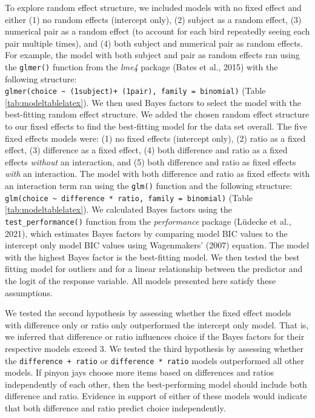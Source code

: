 \documentclass[
  ,pub,floatsintext]{apa6}
\begin{document}
To explore random effect structure, we included models with no fixed effect and either (1) no random effects (intercept only), (2) subject as a random effect, (3) numerical pair as a random effect (to account for each bird repeatedly seeing each pair multiple times), and (4) both subject and numerical pair as random effects. For example, the model with both subject and pair as random effects ran using the \texttt{glmer()} function from the \emph{lme4} package (Bates et al., 2015) with the following structure: \texttt{glmer(choice\ \textasciitilde{}\ (1\textbar{}subject)+\ (1\textbar{}pair),\ family\ =\ binomial)} (Table \ref{tab:modeltablelatex}). We then used Bayes factors to select the model with the best-fitting random effect structure. We added the chosen random effect structure to our fixed effects to find the best-fitting model for the data set overall. The five fixed effects models were: (1) no fixed effects (intercept only), (2) ratio as a fixed effect, (3) difference as a fixed effect, (4) both difference and ratio as a fixed effects \emph{without} an interaction, and (5) both difference and ratio as fixed effects \emph{with} an interaction. The model with both difference and ratio as fixed effects with an interaction term ran using the \texttt{glm()} function and the following structure: \texttt{glm(choice\ \textasciitilde{}\ difference\ *\ ratio,\ family\ =\ binomial)} (Table \ref{tab:modeltablelatex}). We calculated Bayes factors using the \texttt{test\_performance()} function from the \emph{performance} package (Lüdecke et al., 2021), which estimates Bayes factors by comparing model BIC values to the intercept only model BIC values using Wagenmakers' (2007) equation. The model with the highest Bayes factor is the best-fitting model. We then tested the best fitting model for outliers and for a linear relationship between the predictor and the logit of the response variable. All models presented here satisfy these assumptions.

We tested the second hypothesis by assessing whether the fixed effect models with difference only or ratio only outperformed the intercept only model. That is, we inferred that difference or ratio influences choice if the Bayes factors for their respective models exceed 3. We tested the third hypothesis by assessing whether the \texttt{difference\ +\ ratio} or \texttt{difference\ *\ ratio} models outperformed all other models. If pinyon jays choose more items based on differences and ratios independently of each other, then the best-performing model should include both difference and ratio. Evidence in support of either of these models would indicate that both difference and ratio predict choice independently.
\end{document}

